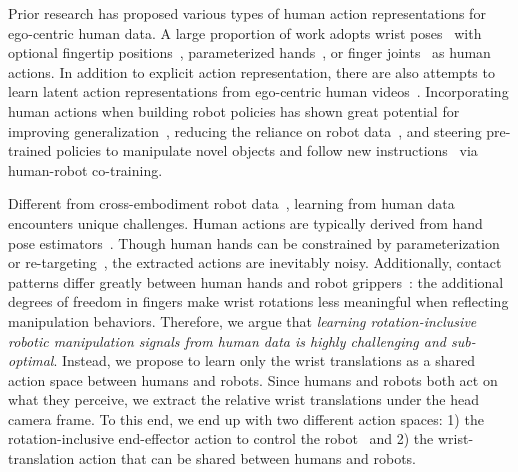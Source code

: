 \documentclass{llmxive}
\begin{document}
Prior research has proposed various types of human action representations for ego-centric human data.
% 
A large proportion of work adopts wrist poses~\cite{kareer2025egomimic,zhu2026emma,punamiya2025egobridge,cheang2025gr3,kareer2025emergence} with optional fingertip positions~\cite{cai2025n,qiu2025humanoid}, parameterized hands~\cite{romero2022embodied,luo2025being,luo2026being,yang2025egovla}, or finger joints~\cite{zheng2026egoscale} as human actions.
% 
In addition to explicit action representation, there are also attempts to learn latent action representations from ego-centric human videos~\cite{chen2025moto,fan2025xr,bruce2024genie,ye2024latent}.
% 
Incorporating human actions when building robot policies has shown great potential for improving generalization~\cite{kareer2025egomimic,punamiya2025egobridge,cai2025n}, reducing the reliance on robot data~\cite{zheng2026egoscale,bi2026h}, and steering pre-trained policies to manipulate novel objects and follow new instructions~\cite{cheang2025gr3,kareer2025emergence,yuan2025motiontrans} via human-robot co-training.




Different from cross-embodiment robot data~\cite{o2024open,wu2024robomind,hou2025robomind,wu2025robocoin}, learning from human data encounters unique challenges. 
% 
Human actions are typically derived from hand pose estimators~\cite{kareer2025emergence,cheang2025gr3,kareer2025egomimic,yang2025egovla}.
% 
Though human hands can be constrained by parameterization~\cite{luo2025being,luo2026being,pavlakos2024reconstructing,romero2022embodied,yang2025egovla} or re-targeting~\cite{zheng2026egoscale}, the extracted actions are inevitably noisy.
% 
Additionally, contact patterns differ greatly between human hands and robot grippers~\cite{wei2026one}: the additional degrees of freedom in fingers make wrist rotations less meaningful when reflecting manipulation behaviors.
% 
Therefore, we argue that \emph{learning rotation-inclusive robotic manipulation signals from human data is highly challenging and sub-optimal}.
% 
Instead, we propose to learn only the wrist translations as a shared action space between humans and robots.
% 
Since humans and robots both act on what they perceive, we extract the relative wrist translations under the head camera frame.
% 
To this end, we end up with two different action spaces: 1) the rotation-inclusive end-effector action to control the robot~\cite{zheng2026egoscale,cheang2025gr3,kareer2025emergence} and 2) the wrist-translation action that can be shared between humans and robots.
\end{document}
